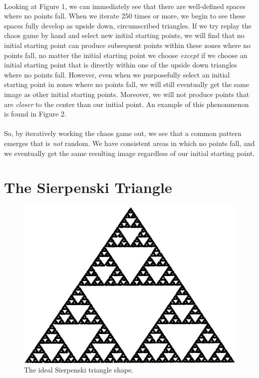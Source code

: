 \documentclass{article}
\begin{document}
\paragraph{}
Looking at Figure 1, we can immediately see that there are well-defined spaces where no points fall. When we iterate 250 times or more, we begin to see these spaces fully develop as upside down, circumscribed triangles. If we try replay the chaos game by hand and select new initial starting points, we will find that no initial starting point can produce subsequent points within these zones where no points fall, no matter the initial starting point we choose \textit{except} if we choose an initial starting point that is directly within one of the upside down triangles where no points fall. However, even when we purposefully select an initial starting point in zones where no points fall, we will still eventually get the same image as other initial starting points. Moreover, we will not produce points that are \textit{closer} to the center than our initial point. An example of this phenonmenon is found in Figure 2.
\paragraph{}
 So, by iteratively working the chaos game out, we see that a common pattern emerges that is \textit{not} random. We have consistent areas in which no points fall, and we eventually get the same resulting image regardless of our initial starting point.
\section*{The Sierpenski Triangle}
\begin{figure}[H]
    \centering
    \includegraphics[width=.5\linewidth, height=.25\textheight]{ideal}
    \caption{The ideal Sierpenski triangle shape.}
\end{figure}
\end{document}

